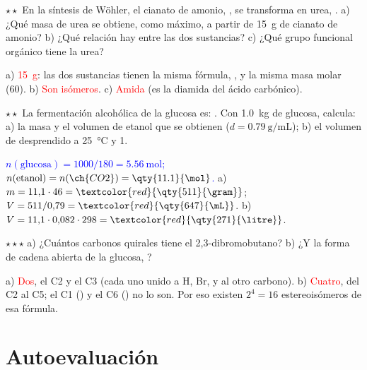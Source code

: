 \begin{exercise}
    \(\star\star\) En la síntesis de Wöhler, el cianato de amonio, , se transforma en urea, . a) ¿Qué masa
    de urea se obtiene, como máximo, a partir de \qty{15}{\gram} de cianato de amonio? b) ¿Qué relación hay entre las dos
    sustancias? c) ¿Qué grupo funcional orgánico tiene la urea?
    \begin{solu}
        a) \textcolor{red}{\qty{15}{\gram}}: las dos sustancias tienen la misma fórmula, , y la misma masa molar (60).
        b) \textcolor{red}{Son isómeros}. c) \textcolor{red}{Amida} (es la diamida del ácido carbónico).
    \end{solu}
\end{exercise}

\begin{exercise}
    \(\star\star\) La fermentación alcohólica de la glucosa es: . Con \qty{1.0}{\kilo\gram} de
    glucosa, calcula: a) la masa y el volumen de etanol que se obtienen (\(d = \qty{0.79}{\gram\per\mL}\)); b) el volumen de
     desprendido a \qty{25}{\degreeCelsius} y \qty{1}{\atm}.
    \begin{solu}
        \textcolor{blue}{\(n(\text{glucosa}) = 1000/180 = \qty{5.56}{\mol}\); \(n(\text{etanol}) = n(\ch{CO2}) = \qty{11.1}{\mol}\).}
        a) \(m = 11{,}1 \cdot 46 = \textcolor{red}{\qty{511}{\gram}}\); \(V = 511/0{,}79 = \textcolor{red}{\qty{647}{\mL}}\).
        b) \(V = 11{,}1 \cdot 0{,}082 \cdot 298 = \textcolor{red}{\qty{271}{\litre}}\).
    \end{solu}
\end{exercise}

\begin{exercise}
    \(\star\star\star\) a) ¿Cuántos carbonos quirales tiene el 2,3-dibromobutano? b) ¿Y la forma de cadena abierta de la glucosa,
    ?
    \begin{solu}
        a) \textcolor{red}{Dos}, el C2 y el C3 (cada uno unido a H, Br,  y al otro carbono). b) \textcolor{red}{Cuatro}, del C2
        al C5; el C1 () y el C6 () no lo son. Por eso existen \(2^4 = 16\) estereoisómeros de esa fórmula.
    \end{solu}
\end{exercise}

\section{Autoevaluación}\label{sec:ud7-autoevaluacion}


